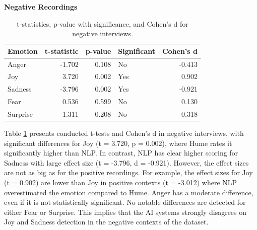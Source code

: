 \begin{table}[H]
    \centering
    \caption*{\textbf{Negative Recordings}}
    \begin{tabular}{lrrlr}
      \toprule
      \textbf{Emotion} & \textbf{t-statistic} & \textbf{p-value} & \textbf{Significant} & \textbf{Cohen’s d} \\
      \midrule
      Anger    & -1.702 & 0.108   & No  & -0.413 \\
      Joy      &  3.720 & 0.002   & Yes &  0.902 \\
      Sadness  & -3.796 & 0.002   & Yes & -0.921 \\
      Fear     &  0.536 & 0.599   & No  &  0.130 \\
      Surprise &  1.311 & 0.208   & No  &  0.318 \\
      \bottomrule
    \end{tabular}
    \caption{t-statistics, p-value with significance, and Cohen’s d for negative interviews.}
    \label{tab:t-test-neg}
  \end{table}
Table \ref{tab:t-test-neg} presents conducted t-tests and Cohen's d in negative interviews, with significant differences for Joy (t = 3.720, p = 0.002), where Hume rates it significantly higher than NLP. 
In contrast, NLP has clear higher scoring for Sadness with large effect size (t = -3.796, d = -0.921). However, the effect sizes are not as big as for the positive recordings. 
For example, the effect sizes for Joy (t = 0.902) are lower than Joy in positive contexts (t = -3.012) where NLP overestimated the emotion compared to Hume.
Anger has a moderate difference, even if it is not statistically significant. No notable differences are detected for either Fear or Surprise. 
This implies that the AI systems strongly disagrees on Joy and Sadness detection in the negative contexts of the dataset. 

